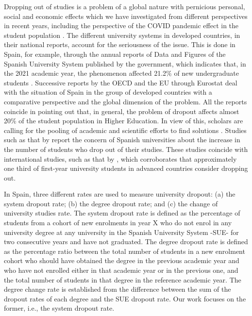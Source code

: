 \documentclass[english]{textolivre}
\begin{document}
Dropping out of studies is a problem of a global nature with pernicious personal, social and economic effects which we have investigated from different perspectives in recent years, including the perspective of the COVID pandemic effect in the student population \cite{fernandez_cruz_evaluation_2020,lizarte_simon_determinantes_2020,lizarte_simon_caracterizacion_2019}. The different university systems in developed countries, in their national reports, account for the seriousness of the issue. This is done in Spain, for example, through the annual reports of Data and Figures of the Spanish University System published by the government, which indicates that, in the 2021 academic year, the phenomenon affected 21.2\% of new undergraduate students \cite{ministerio_de_universidades_datos_2021}. Successive reports by the OECD and the EU through Eurostat deal with the situation of Spain in the group of developed countries with a comparative perspective and the global dimension of the problem. All the reports coincide in pointing out that, in general, the problem of dropout affects almost 20\% of the student population in Higher Education. In view of this, scholars are calling for the pooling of academic and scientific efforts to find solutions \cite{feixas_condom_hacia_2015}. Studies such as that by \textcite{cabrera_evolucion_2014} report the concern of Spanish universities about the increase in the number of students who drop out of their studies. These studies coincide with international studies, such as that by \textcite{tinto_reflections_2017}, which corroborates that approximately one third of first-year university students in advanced countries consider dropping out.

In Spain, three different rates are used to measure university dropout: (a) the system dropout rate; (b) the degree dropout rate; and (c) the change of university studies rate. The system dropout rate is defined as the percentage of students from a cohort of new enrolments in year X who do not enrol in any university degree at any university in the Spanish University System -SUE- for two consecutive years and have not graduated. The degree dropout rate is defined as the percentage ratio between the total number of students in a new enrolment cohort who should have obtained the degree in the previous academic year and who have not enrolled either in that academic year or in the previous one, and the total number of students in that degree in the reference academic year. The degree change rate is established from the difference between the sum of the dropout rates of each degree and the SUE dropout rate. Our work focuses on the former, i.e., the system dropout rate.
\end{document}
